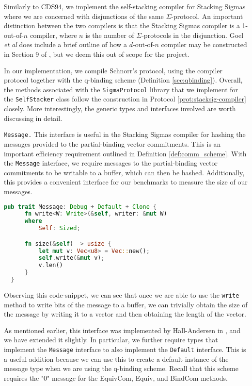 Similarly to CDS94, we implement the self-stacking compiler for Stacking Sigmas where 
we are concerned with disjunctions of the same $\Sigma$-protocol. An important distinction between 
the two compilers is that the Stacking Sigmas compiler is a 1-out-of-$n$ compiler, where $n$ is the
number of $\Sigma$-protocols in the disjunction. Goel \emph{et al} does include a brief outline of 
how a $d$-out-of-$n$ compiler may be constructed in Section 9 of \cite{StackingSigmas}, but we deem 
this out of scope for the project. 

In our implementation, we compile Schnorr's protocol, using the 
compiler protocol together with the q-binding scheme (Definition \ref{sec:qbinding}).
Overall, the methods associated with the \texttt{SigmaProtocol} library that we implement for the 
\texttt{SelfStacker} class follow the construction in Protocol \ref{prot:stacksig-compiler} closely. 
More interestingly, the generic types and interfaces involved are worth discussing in detail.

\texttt{\texttt{Message}.} This interface is useful in the Stacking Sigmas compiler 
for hashing the messages provided to the partial-binding vector commitments. This is 
an important efficiency requirement outlined in Definition \ref{def:comm_scheme}. 
With the \texttt{Message} interface, we require messages to the partial-binding vector
commitments to be writable to a buffer, which can then be hashed. Additionally, this 
provides a convenient interface for our benchmarks to measure the size of our messages. 

\begin{lstlisting}[language=rust]
  pub trait Message: Debug + Default + Clone {
      fn write<W: Write>(&self, writer: &mut W)
      where
          Self: Sized;

      fn size(&self) -> usize {
          let mut v: Vec<u8> = Vec::new();
          self.write(&mut v);
          v.len()
      }
  }  
\end{lstlisting}

Observing this code-snippet, we can see that once we are able to use the \texttt{write} 
method to write bits of the message to a buffer, we can trivially obtain the size of 
the message by writing it to a vector and then obtaining the length of the vector.

As mentioned earlier, this interface was implemented by Hall-Andersen in 
\cite{MHAStackSig}, and we have extended it slightly. In particular, we further require types 
that implement the \texttt{Message} interface to also implement the \texttt{Default} interface. 
This is a useful addition 
because we can use this to create a default instance of the message type when we are 
using the q-binding scheme. Recall that this scheme requires the "0" message for the 
\textsf{EquivCom}, \textsf{Equiv}, and \textsf{BindCom} methods.

